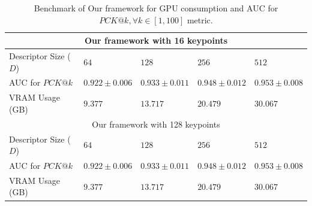 \begin{table}[htb]
    \caption{Benchmark of Our framework for GPU consumption and AUC for $PCK@k,  \forall k \in [1, 100]$ metric.}
    \label{table:framework_training_results}
    \centering
    \begin{tabular}{lllll}
        \toprule
        \multicolumn{5}{c}{Our framework with 16 keypoints}                                                   \\
        \midrule
        Descriptor Size ($D$) & $64 $             & $128 $            & $256 $            & $512$             \\
        AUC for $PCK@k$       & $0.922 \pm 0.006$ & $0.933 \pm 0.011$ & $0.948 \pm 0.012$ & $0.953 \pm 0.008$ \\
        VRAM Usage (GB)       & $9.377 $          & $13.717 $         & $20.479 $         & $30.067$          \\ \hline
        \multicolumn{5}{c}{Our framework with 128 keypoints}                                                  \\
        \midrule
        Descriptor Size ($D$) & $64 $             & $128 $            & $256 $            & $512$             \\
        AUC for $PCK@k$       & $0.922 \pm 0.006$ & $0.933 \pm 0.011$ & $0.948 \pm 0.012$ & $0.953 \pm 0.008$ \\
        VRAM Usage (GB)       & $9.377 $          & $13.717 $         & $20.479 $         & $30.067$          \\
        \bottomrule
    \end{tabular}
\end{table}